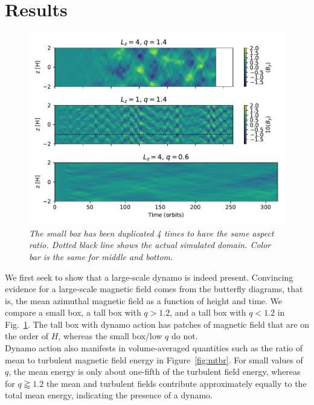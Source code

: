 \documentclass{epsconf}
\begin{document}
\section{Results}
\begin{figure}
\vspace{-1cm} \begin{center}
\includegraphics[width=\linewidth]{fig_xyazte_butterfly_compare_qz.pdf}
\caption{\it \small The small box has been duplicated 4 times to have the same aspect ratio. Dotted black line shows the actual simulated domain. Color bar is the same for middle and bottom.}
\label{fig:butterfly}
\end{center} 
\vspace{-1cm}
\end{figure}%
We first seek to show that a large-scale dynamo is indeed present. Convincing evidence for a large-scale magnetic field comes from the butterfly diagrams, that is, the mean azimuthal magnetic field as a function of height and time. We compare a small box, a tall box with $q>1.2$, and a tall box with $q<1.2$ in Fig.~\ref{fig:butterfly}. The tall box with dynamo action has patches of magnetic field that are on the order of $H$, whereas the small box/low $q$ do not.\\
%
Dynamo action also manifests in volume-averaged quantities such as the ratio of mean to turbulent magnetic field energy in Figure~\ref{fig:mtbr}. For small values of $q$, the mean energy is only about one-fifth of the turbulent field energy, whereas for $q\gtrapprox1.2$ the mean and turbulent fields contribute approximately equally to the total mean energy, indicating the presence of a dynamo.%
\end{document}
